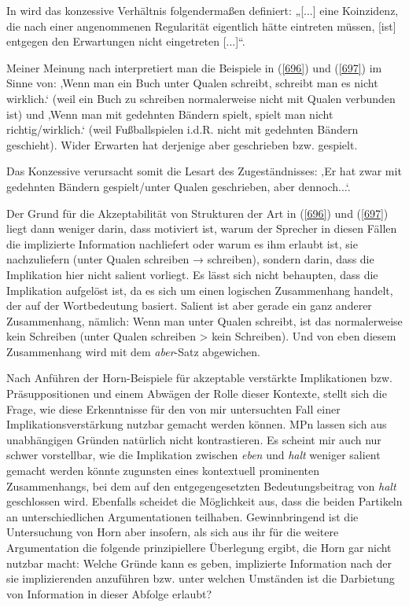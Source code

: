 In \citet[2293]{Zifonun1997} wird das konzessive Verhältnis folgendermaßen definiert: „[...] eine Koinzidenz, die nach einer angenommenen Regularität eigentlich hätte eintreten müssen, [ist] entgegen den Erwartungen nicht eingetreten [...]“.

Meiner Meinung nach interpretiert man die Beispiele in (\ref{696}) und (\ref{697}) im Sinne von: ‚Wenn man ein Buch unter Qualen schreibt, schreibt man es nicht wirklich.‘ (weil ein Buch zu schreiben normalerweise nicht mit Qualen verbunden ist) und ‚Wenn man mit gedehnten Bändern spielt, spielt man nicht richtig/wirklich.‘ (weil Fußballspielen i.d.R. nicht mit gedehnten Bändern geschieht). Wider Erwarten hat derjenige aber geschrieben bzw. gespielt.

Das Konzessive verursacht somit die Lesart des Zugeständnisses: ‚Er hat zwar mit gedehnten Bändern gespielt/unter Qualen geschrieben, aber dennoch...‘. 

Der Grund für die Akzeptabilität von Strukturen der Art in (\ref{696}) und (\ref{697}) liegt dann weniger darin, dass motiviert ist, warum der Sprecher in diesen Fällen die implizierte Information nachliefert oder warum es ihm erlaubt ist, sie nachzulie\-fern (unter Qualen schreiben → schreiben), sondern darin, dass die Implikation hier nicht salient vorliegt. Es lässt sich nicht behaupten, dass die Implikation aufgelöst ist, da es sich um einen logischen Zusammenhang handelt, der auf der Wortbedeutung basiert. Salient ist aber gerade ein ganz anderer Zusammenhang, nämlich: Wenn man unter Qualen schreibt, ist das normalerweise kein Schreiben (unter Qualen schreiben > kein Schreiben). Und von eben diesem Zusammenhang wird mit dem \textit{aber}-Satz abgewichen.

Nach Anführen der Horn-Beispiele für akzeptable verstärkte Implikationen bzw. Präsuppositionen und einem Abwägen der Rolle dieser Kontexte, stellt sich die Frage, wie diese Erkenntnisse für den von mir untersuchten Fall einer Implikationsverstärkung nutzbar gemacht werden können. MPn lassen sich aus unabhängigen Gründen natürlich nicht kontrastieren. Es scheint mir auch nur schwer vorstellbar, wie die Implikation zwischen \textit{eben} und \textit{halt} weniger salient gemacht werden könnte zugunsten eines kontextuell prominenten Zusammenhangs, bei dem auf den entgegengesetzten Bedeutungsbeitrag von \textit{halt} geschlossen wird. Ebenfalls scheidet die Möglichkeit aus, dass die beiden Partikeln an unterschiedli\-chen Argumentationen teilhaben. Gewinnbringend ist die Untersuchung von Horn aber insofern, als sich aus ihr für die weitere Argumentation die folgende prinzipiellere Überlegung ergibt, die Horn gar nicht nutzbar macht: Welche Grün\-de kann es geben, implizierte Information nach der sie implizierenden anzuführen bzw. unter welchen Umständen ist die Darbietung von Information in dieser Abfolge erlaubt?

